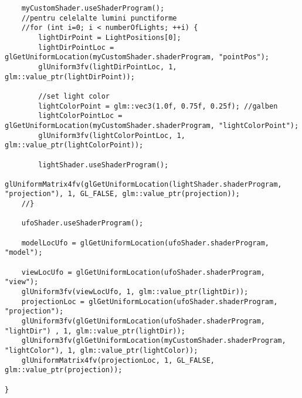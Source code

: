 \begin{itemize}
\begin{verbatim}
	myCustomShader.useShaderProgram();
	//pentru celelalte lumini punctiforme
	//for (int i=0; i < numberOfLights; ++i) {
		lightDirPoint = LightPositions[0];
		lightDirPointLoc = glGetUniformLocation(myCustomShader.shaderProgram, "pointPos");
		glUniform3fv(lightDirPointLoc, 1, glm::value_ptr(lightDirPoint));

		//set light color
		lightColorPoint = glm::vec3(1.0f, 0.75f, 0.25f); //galben
		lightColorPointLoc = glGetUniformLocation(myCustomShader.shaderProgram, "lightColorPoint");
		glUniform3fv(lightColorPointLoc, 1, glm::value_ptr(lightColorPoint));

		lightShader.useShaderProgram();
		glUniformMatrix4fv(glGetUniformLocation(lightShader.shaderProgram, "projection"), 1, GL_FALSE, glm::value_ptr(projection));
	//}

	ufoShader.useShaderProgram();

	modelLocUfo = glGetUniformLocation(ufoShader.shaderProgram, "model");
	
	viewLocUfo = glGetUniformLocation(ufoShader.shaderProgram, "view");
	glUniform3fv(viewLocUfo, 1, glm::value_ptr(lightDir));
	projectionLoc = glGetUniformLocation(ufoShader.shaderProgram, "projection");
	glUniform3fv(glGetUniformLocation(ufoShader.shaderProgram, "lightDir") , 1, glm::value_ptr(lightDir));
	glUniform3fv(glGetUniformLocation(myCustomShader.shaderProgram, "lightColor"), 1, glm::value_ptr(lightColor));
	glUniformMatrix4fv(projectionLoc, 1, GL_FALSE, glm::value_ptr(projection));

}
	\end{verbatim}
	

\end{itemize}

